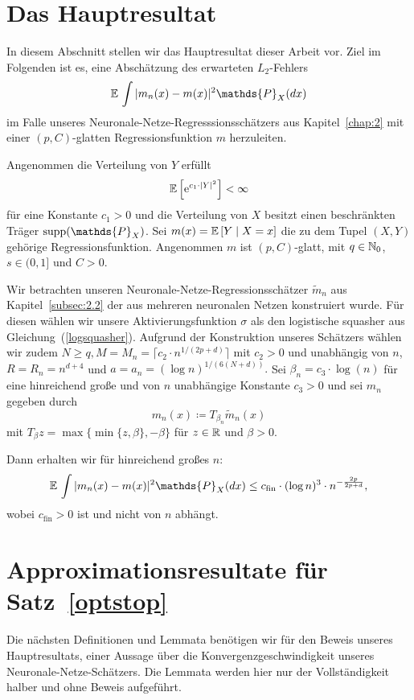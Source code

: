 \section{Das Hauptresultat}
In diesem Abschnitt stellen wir das Hauptresultat dieser Arbeit vor.
Ziel im Folgenden ist es, eine Abschätzung des erwarteten $L_2$-Fehlers 
$$\E \int |m_n(x) - m(x)|^2  \mathds{P}_X(dx)$$
im Falle unseres Neuronale-Netze-Regresssionsschätzers aus Kapitel~\ref{chap:2} mit einer $(p,C)$-glatten Regressionsfunktion $m$ herzuleiten.

\begin{thm}\label{optstop}
Angenommen die Verteilung von $Y$ erfüllt 
$$ \mathbb{E}\,\Big[\mathrm{e}^{c_1 \cdot |Y|^2}\Big] < \infty$$
für eine Konstante $c_1 > 0$ und die Verteilung von $X$ besitzt einen beschränkten Träger $\supp(\mathds{P}_X)$. Sei $m(x) = \mathbb{E}\,[Y \mid X = x]$ die zu dem Tupel $(X, Y)$ gehörige Regressionsfunktion.
Angenommen $m$ ist $(p,C)$-glatt, mit $q \in \mathbb{N}_0$, $s \in (0,1]$ und $C > 0$. 

Wir betrachten unseren Neuronale-Netze-Regressionsschätzer $\tilde{m}_n$ aus Kapitel~\ref{subsec:2.2} der aus mehreren neuronalen Netzen konstruiert wurde. Für diesen wählen wir unsere Aktivierungsfunktion $\sigma$ als den logistische squasher aus Gleichung~(\ref{logsquasher}). Aufgrund der Konstruktion unseres Schätzers wählen wir zudem $N \geq q, M = M_n = \lceil c_2 \cdot n^{1/(2p + d)}\rceil$ mit $c_2 >0$ und unabhängig von $n$, $R = R_n = n^{d + 4}$ und $a = a_n = (\log n)^{1/(6(N + d))}.$
Sei $\beta_n = c_3 \cdot \log(n)$ für eine hinreichend große und von $n$ unabhängige Konstante $c_3 > 0$ und sei $m_n$ gegeben durch
$$m_n(x) \coloneqq T_{\beta_n}\tilde{m}_n (x)$$
mit $T_{\beta}z = \max\{\min\{z, \beta\}, -\beta\}$ für $z \in \mathbb{R}$ und $\beta > 0.$ 

Dann erhalten wir für hinreichend großes $n$:
$$\E \int |m_n(x) - m(x)|^2  \mathds{P}_X(dx) \leq c_{\text{fin}} \cdot (\log n)^3 \cdot n^{- \frac{2p}{2p + d}},$$
wobei $c_{\text{fin}} > 0$ ist und nicht von $n$ abhängt.
\end{thm}

\section{Approximationsresultate für Satz~\ref{optstop}}
Die nächsten  Definitionen und Lemmata benötigen wir für den Beweis unseres Hauptresultats, einer Aussage über die Konvergenzgeschwindigkeit unseres Neuronale-Netze-Schätzers. Die Lemmata werden hier nur der Vollständigkeit halber und ohne Beweis aufgeführt. 

